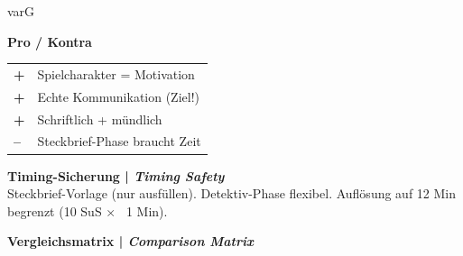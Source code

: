 \documentclass[11pt, a4paper]{article}
\newcommand{\en}[1]{{\small\color{english}\textit{#1}}}
\newcommand{\pro}{\textcolor{success}{\textbf{+}}}
\newcommand{\kontra}{\textcolor{spanisch}{\textbf{--}}}
\newcommand{\risikoniedrig}{\colorbox{success!20}{\textcolor{success}{\scriptsize\textbf{NIEDRIG}}}}
\newcommand{\score}[1]{\colorbox{spanisch!15}{\textcolor{spanisch}{\textbf{#1/10}}}}
\begin{document}
\begin{varbox}[title={\textcolor{varG}{VARIANTE G: Steckbrief-Detektiv} \hfill \score{9.4} \risikoniedrig}]{varG}
\begin{minipage}[t]{0.48\textwidth}
\vspace{0.3cm}

\textbf{Pro / Kontra}\\[0.1cm]
\begin{tabular}{ll}
\pro & Spielcharakter = Motivation \\
\pro & Echte Kommunikation (Ziel!) \\
\pro & Schriftlich + mündlich \\
\kontra & Steckbrief-Phase braucht Zeit \\
\end{tabular}

\vspace{0.2cm}

\textbf{Timing-Sicherung | \en{Timing Safety}}\\[0.1cm]
Steckbrief-Vorlage (nur ausfüllen). Detektiv-Phase flexibel. Auflösung auf 12 Min begrenzt (10 SuS × ~1 Min).
\end{minipage}

\end{varbox}

\vspace{0.5cm}


\begin{center}
{\large\bfseries Vergleichsmatrix | \en{Comparison Matrix}}
\end{center}

\vspace{0.2cm}
\end{document}
